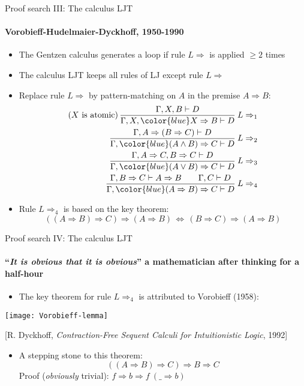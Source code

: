 \documentclass[english]{beamer}
\begin{document}
\begin{frame}{Proof search III: The calculus LJT}


\framesubtitle{Vorobieff-Hudelmaier-Dyckhoff, 1950-1990}
\begin{itemize}
\item The Gentzen calculus generates a loop if rule $L\Rightarrow$ is applied
$\geq2$ times
\item The calculus LJT keeps all rules of LJ except rule $L\Rightarrow$
\item Replace rule $L\Rightarrow$ by pattern-matching on $A$ in the premise
$A\Rightarrow B$:
\begin{align*}
\text{(}X\text{ is atomic)\,}\frac{\Gamma,X,B\vdash D}{\Gamma,X,{\color{blue}X\Rightarrow B}\vdash D}\:L\Rightarrow_{1}\\
\frac{\Gamma,A\Rightarrow(B\Rightarrow C)\vdash D}{\Gamma,{\color{blue}(A\wedge B)\Rightarrow C}\vdash D}\:L\Rightarrow_{2}\\
\frac{\Gamma,A\Rightarrow C,B\Rightarrow C\vdash D}{\Gamma,{\color{blue}(A\vee B)\Rightarrow C}\vdash D}\:L\Rightarrow_{3}\\
\frac{\Gamma,B\Rightarrow C\vdash A\Rightarrow B\quad\quad\Gamma,C\vdash D}{\Gamma,{\color{blue}(A\Rightarrow B)\Rightarrow C}\vdash D}\:L\Rightarrow_{4}
\end{align*}
\item Rule $L\Rightarrow_{4}$ is based on the key theorem: 
\[
\left(\left(A\Rightarrow B\right)\Rightarrow C\right)\Rightarrow\left(A\Rightarrow B\right)\,\Longleftrightarrow\,\left(B\Rightarrow C\right)\Rightarrow\left(A\Rightarrow B\right)
\]
\end{itemize}
\end{frame}

\begin{frame}{Proof search IV: The calculus LJT}


\framesubtitle{``\emph{It is obvious that it is obvious}'' \textendash{} a mathematician
after thinking for a half-hour}
\begin{itemize}
\item The key theorem for rule $L\Rightarrow_{4}$ is attributed to Vorobieff
(1958):
\end{itemize}
\begin{center}
\texttt{[image: Vorobieff-lemma]}
\par\end{center}

\begin{center}
{\footnotesize{}{[}R. Dyckhoff, }\emph{\footnotesize{}Contraction-Free
Sequent Calculi for Intuitionistic Logic}{\footnotesize{}, 1992{]}}
\par\end{center}{\footnotesize \par}
\begin{itemize}
\item A stepping stone to this theorem:
\[
\left(\left(A\Rightarrow B\right)\Rightarrow C\right)\Rightarrow B\Rightarrow C
\]
Proof (\emph{obviously} trivial): $f\Rightarrow b\Rightarrow f\:(\_\Rightarrow b)$
\end{itemize}
\end{frame}
\end{document}
